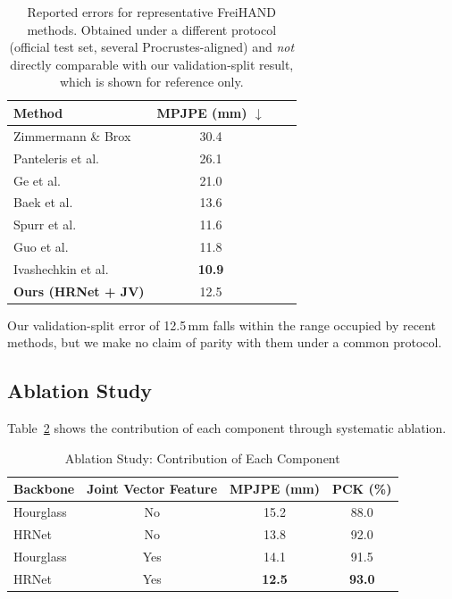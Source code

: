 \begin{table}[ht]
\centering
\caption{Reported errors for representative FreiHAND methods. Obtained under a different protocol (official test set, several Procrustes-aligned) and \emph{not} directly comparable with our validation-split result, which is shown for reference only.}
\label{tab:sota_comparison}
\begin{tabular}{lccc}
\toprule
\textbf{Method}   & \textbf{MPJPE (mm)} $\downarrow$ \\
\midrule
Zimmermann \& Brox \cite{zimmermann2017learning} & 30.4 \\
Panteleris et al. \cite{panteleris2018single}  & 26.1 \\
Ge et al. \cite{ge2019handshape} & 21.0 \\
Baek et al. \cite{baek2019pushing}  & 13.6 \\
Spurr et al. \cite{spurr2021selfsupervised}  & 11.6 \\
Guo et al. \cite{guo2022featureinteraction}  & 11.8 \\
Ivashechkin et al. \cite{ivashechkin2023diffusion}  & \textbf{10.9} \\
\midrule
\textbf{Ours (HRNet + JV)} & 12.5 \\
\bottomrule
\end{tabular}
\end{table}

Our validation-split error of 12.5\,mm falls within the range occupied by recent methods, but we make no claim of parity with them under a common protocol.

\subsection{Ablation Study}
\label{sec:ablation}
Table~\ref{tab:ablation} shows the contribution of each component through systematic ablation.

\begin{table}[ht]
\centering
\caption{Ablation Study: Contribution of Each Component}
\label{tab:ablation}
\begin{tabular}{lccc}
\toprule
\textbf{Backbone} & \textbf{Joint Vector Feature} & \textbf{MPJPE (mm)} & \textbf{PCK (\%)} \\
\midrule
Hourglass & No & 15.2 & 88.0 \\
HRNet     & No & 13.8 & 92.0 \\
Hourglass & Yes & 14.1 & 91.5 \\
HRNet     & Yes & \textbf{12.5} & \textbf{93.0} \\
\bottomrule
\end{tabular}
\end{table}

